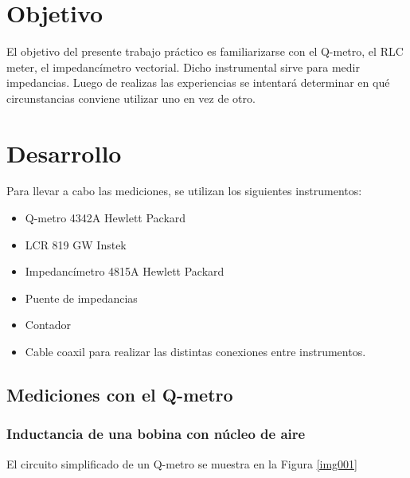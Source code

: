 \documentclass[a4paper,10pt]{article}
\title{  }
\begin{document}
	\maketitle %
	\newpage

	\tableofcontents %
	\newpage


\section{Objetivo}
	
	\indent	El objetivo del presente trabajo práctico es familiarizarse con 
	el Q-metro, el RLC meter, el impedancímetro vectorial. Dicho instrumental
	sirve para medir impedancias. Luego de realizas las experiencias se 
	intentará determinar en qué circunstancias conviene utilizar uno en vez 
	de otro.

	\newpage
\section{Desarrollo}
	
	\indent Para llevar a cabo las mediciones, se utilizan los siguientes 
	instrumentos:
		\begin{itemize}
			\item Q-metro 4342A Hewlett Packard
			\item LCR 819 GW Instek
			\item Impedanc\'imetro 4815A Hewlett Packard
			\item Puente de impedancias
			\item Contador
			\item Cable coaxil para realizar las distintas conexiones entre 
			instrumentos.
		\end{itemize}	
	
	\subsection{Mediciones con el Q-metro}
		\subsubsection{Inductancia de una bobina con n\'ucleo de aire}
		\label{inductancia}
		\indent El circuito simplificado de un Q-metro se muestra en la Figura
		\ref{img001}
\end{document}
